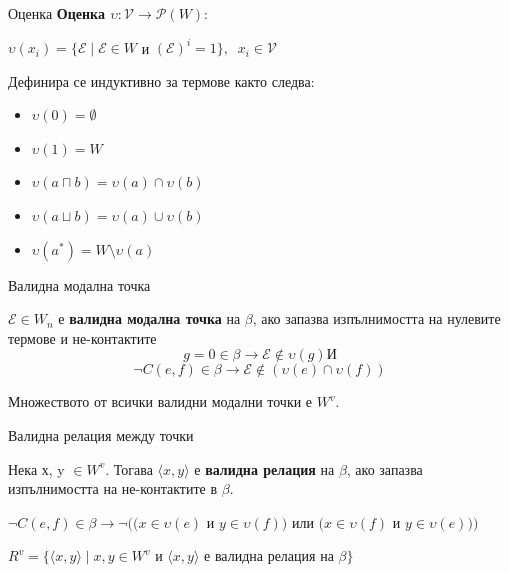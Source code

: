 \documentclass[14pt, aspectratio=169]{beamer}
\newcommand\p{\mathcal{P}}
\newcommand\V{\mathcal{V}}
\newcommand\E{\mathcal{E}}
\newcommand{\pair}[2]{ \langle #1, #2 \rangle }
\newcommand{\pairXY}{ \pair{x}{y} }
\begin{document}
\begin{frame}{Оценка}
	\textbf{Оценка $\upsilon : \V \rightarrow \p(W)$}:
	\begin{center}
		$\upsilon(x_i) = \{ \E \mid \E \in W$ и $(\E)^i = 1 \}, \;\; x_i \in \V$
	\end{center}
	Дефинира се индуктивно за термове както следва:
	\begin{itemize}
		\item $\upsilon(0) = \emptyset$
		\item $\upsilon(1) = W$
		\item $\upsilon(a \sqcap b) = \upsilon(a) \cap \upsilon(b)$
		\item $\upsilon(a \sqcup b) = \upsilon(a) \cup \upsilon(b)$
		\item $\upsilon(a^*) = W \setminus \upsilon(a)$
	\end{itemize}
\end{frame}

\begin{frame}{Валидна модална точка}
	\begin{definition}
		$\E \in W_n$ е \textbf{валидна модална точка} на $\beta$, ако запазва изпълнимостта на нулевите термове и не-контактите
		\begin{equation*}
			g = 0 \in \beta \rightarrow \E \notin \upsilon(g) И
		\end{equation*}
		\begin{equation*}
			\neg C(e, f) \in \beta \rightarrow \E \notin (\upsilon(e) \cap \upsilon(f))
		\end{equation*}
	\end{definition}

	\begin{definition}[$W^v$]
		Множеството от всички валидни модални точки е \textbf{$W^v$}.
	\end{definition}
\end{frame}

\begin{frame}{Валидна релация между точки}
	\begin{definition}
		Нека х, y $\in W^v$. Тогава $\pairXY$ е \textbf{валидна релация} на $\beta$, ако запазва изпълнимостта на не-контактите в $\beta$.
		\begin{center}
			$\neg C(e, f) \in \beta \rightarrow \neg((x \in \upsilon(e)$ и $y \in \upsilon(f))$ или $(x \in \upsilon(f)$ и $y \in \upsilon(e)))$
		\end{center}
	\end{definition}

	\begin{definition}[$R^v$]
		\begin{center}
			$R^v = \{ \pairXY  \mid x, y \in W^v$ и $\pairXY$  е валидна релация на $\beta\}$
		\end{center}
	\end{definition}
\end{frame}
\end{document}
